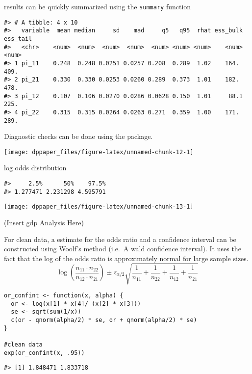 results can be quickly summarized using the \texttt{summary} function

\begin{verbatim}
#> # A tibble: 4 x 10
#>   variable  mean median     sd    mad     q5   q95  rhat ess_bulk ess_tail
#>   <chr>    <num>  <num>  <num>  <num>  <num> <num> <num>    <num>    <num>
#> 1 pi_11    0.248  0.248 0.0251 0.0257 0.208  0.289  1.02    164.      409.
#> 2 pi_21    0.330  0.330 0.0253 0.0260 0.289  0.373  1.01    182.      478.
#> 3 pi_12    0.107  0.106 0.0270 0.0286 0.0628 0.150  1.01     88.1     225.
#> 4 pi_22    0.315  0.315 0.0264 0.0263 0.271  0.359  1.00    171.      289.
\end{verbatim}

Diagnostic checks can be done using the  package.

\begin{center}\texttt{[image: dppaper\_files/figure-latex/unnamed-chunk-12-1]} \end{center}

log odds distribution

\begin{verbatim}
#>     2.5%      50%    97.5% 
#> 1.277471 2.231298 4.595791
\end{verbatim}

\begin{center}\texttt{[image: dppaper\_files/figure-latex/unnamed-chunk-13-1]} \end{center}

(Insert gdp Analysis Here)

For clean data, a estimate for the odds ratio and a confidence interval
can be constructed using Woolf's method (i.e.~A wald confidence interval).
It uses the fact that the log of the odds ratio is approximately
normal for large sample sizes.
\[
\log\left(\dfrac{n_{11} \cdot n_{22}}{n_{12} \cdot n_{21}}\right) 
  \pm z_{\alpha/2}\sqrt{\dfrac{1}{n_{11}} + \dfrac{1}{n_{22}} + \dfrac{1}{n_{12}} + \dfrac{1}{n_{21}}}
\]

\begin{verbatim}
or_confint <- function(x, alpha) {
  or <- log(x[1] * x[4]/ (x[2] * x[3]))
  se <- sqrt(sum(1/x))
  c(or - qnorm(alpha/2) * se, or + qnorm(alpha/2) * se)
}

#clean data
exp(or_confint(x, .95))
\end{verbatim}

\begin{verbatim}
#> [1] 1.848471 1.833718
\end{verbatim}

